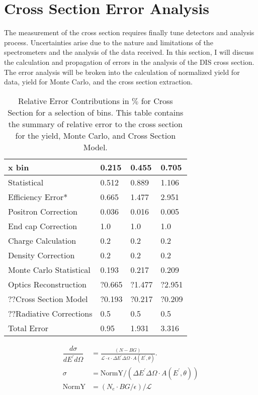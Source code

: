 \section{Cross Section Error Analysis}
The measurement of the cross section requires finally tune detectors and analysis process. Uncertainties arise due to the nature and limitations of the spectrometers and the analysis of the data received. In this section, I will discuss the calculation and propagation of errors in the analysis of the DIS cross section. The error analysis will be broken into the calculation of normalized yield for data, yield for Monte Carlo, and the cross section extraction. 

\begin{table}[]
	\caption{Relative Error Contributions in $\%$ for Cross Section for a selection of bins. This table contains the summary of relative error to the cross section for the yield, Monte Carlo, and Cross Section Model.}
	\centering
	\begin{tabular}{|l|l|l|l|}
		\hline
		\textbf{\qquad \qquad\qquad x bin}   & \textbf{0.215} & \textbf{0.455} & \textbf{0.705} \\ \hline\hline
		Statistical             & 0.512 & 0.889 & 1.106 \\ \hline
		Efficiency Error*       & 0.665 & 1.477 & 2.951 \\ \hline
		Positron Correction     & 0.036 & 0.016 & 0.005 \\ \hline
		End cap Correction     & 1.0 & 1.0 & 1.0 \\ \hline
		Charge Calculation     & 0.2 & 0.2 & 0.2 \\ \hline
		Density Correction      & 0.2 & 0.2 & 0.2 \\ \hline
		Monte Carlo Statistical & 0.193 & 0.217 & 0.209 \\ \hline
		Optics Reconstruction	& ?0.665& ?1.477 &?2.951 \\ \hline
		??Cross Section Model 	& ?0.193 & ?0.217 & ?0.209 \\ \hline
		??Radiative Corrections\cite{primer} 	& 0.5  & 0.5 & 0.5 \\ \hline
		Total Error		 	 	& 0.95  & 1.931 & 3.316 \\ \hline
	\end{tabular}
\end{table}

\begin{align}
\dfrac{d\sigma}{dE^{\prime}d\Omega} &= \frac{(N - BG)}{\mathscr{L} \cdot \epsilon \cdot \Delta E^{\prime} \Delta \Omega \cdot A(E^{\prime},\theta)}. \nonumber\\
\sigma &= \text{NormY}/\left(\Delta E^{\prime} \Delta \Omega \cdot A(E^{\prime},\theta)\right)\nonumber\\
\text{NormY} &= \left(N_e \cdot BG/\epsilon \right) / \mathscr{L}
\end{align}
